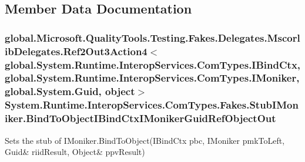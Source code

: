 \subsection{Member Data Documentation}
\hypertarget{class_system_1_1_runtime_1_1_interop_services_1_1_com_types_1_1_fakes_1_1_stub_i_moniker_a2617f630be151eae9ba2cf7fd14ce87c}{
\subsubsection[{Bind\-To\-Object\-I\-Bind\-Ctx\-I\-Moniker\-Guid\-Ref\-Object\-Out}]{\setlength{\rightskip}{0pt plus 5cm}global.\-Microsoft.\-Quality\-Tools.\-Testing.\-Fakes.\-Delegates.\-Mscorlib\-Delegates.\-Ref2\-Out3\-Action4$<$global.\-System.\-Runtime.\-Interop\-Services.\-Com\-Types.\-I\-Bind\-Ctx, global.\-System.\-Runtime.\-Interop\-Services.\-Com\-Types.\-I\-Moniker, global.\-System.\-Guid, object$>$ System.\-Runtime.\-Interop\-Services.\-Com\-Types.\-Fakes.\-Stub\-I\-Moniker.\-Bind\-To\-Object\-I\-Bind\-Ctx\-I\-Moniker\-Guid\-Ref\-Object\-Out}}\label{class_system_1_1_runtime_1_1_interop_services_1_1_com_types_1_1_fakes_1_1_stub_i_moniker_a2617f630be151eae9ba2cf7fd14ce87c}


Sets the stub of I\-Moniker.\-Bind\-To\-Object(I\-Bind\-Ctx pbc, I\-Moniker pmk\-To\-Left, Guid\& riid\-Result, Object\& ppv\-Result)

